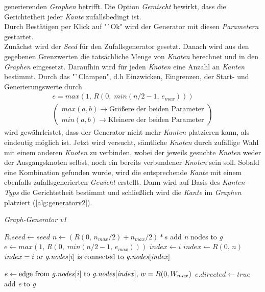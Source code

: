 \documentclass[12pt]{article}
\begin{document}
generierenden \textit{Graphen} betrifft. Die Option \textit{Gemischt} bewirkt, dass die Gerichtetheit jeder \textit{Kante} zufallsbedingt ist.
\\
Durch Bestätigen per Klick auf "`Ok" wird der Generator mit diesen \textit{Parametern} gestartet.
\\
Zunächst wird der \textit{Seed} für den Zufallsgenerator gesetzt. Danach wird aus den gegebenen Grenzwerten die tatsächliche Menge von \textit{Knoten} berechnet und in den \textit{Graphen} eingesetzt. Daraufhin wird für jeden 
\textit{Knoten} eine Anzahl an \textit{Kanten} bestimmt. Durch das "`Clampen", d.h Einzwicken, Eingrenzen, der Start- und 
Generierungswerte durch
\vspace{-20pt}
\begin{gather*}
e = max(1,\,R(0,\;min(n/2-1,\,e_{max}))) \\
\left(\begin{aligned}
max(a, b) \to \text{Größere der beiden Parameter}\\
min(a, b) \to \text{Kleinere der beiden Parameter}
\end{aligned}
\right)
\end{gather*}
wird gewährleistet, dass der Generator nicht mehr \textit{Kanten} platzieren kann, als eindeutig möglich ist. Jetzt wird versucht, sämtliche \textit{Knoten} durch zufällige Wahl mit einem anderen 
\textit{Knoten} zu verbinden, wobei der jeweils gesuchte \textit{Knoten} weder der Ausgangsknoten selbst, noch ein bereits verbundener \textit{Knoten} sein soll. Sobald eine Kombination gefunden wurde, 
wird die entsprechende \textit{Kante} mit einem ebenfalls zufallsgenerierten \textit{Gewicht} erstellt. Dann wird auf Basis des \textit{Kanten-Typs} die Gerichtetheit bestimmt und schließlich wird die 
\textit{Kante} im \textit{Graphen} platziert (\autoref{alg:generatorv2}).

\begin{algorithm}
\caption{\textit{Graph-Generator v1} \label{alg:generator}}
\begin{algorithmic}[1]
\Statex
{}
\Statex
{}
	\State $R.seed \gets seed$
	\State $n \gets (R(0,\,n_{max}/2) + n_{max}/2) * s$
	\State add \textit{n} nodes to \textit{g}
		\State $e \gets max(1,\,R(0,\;min(n/2-1,\,e_{max})))$
			\State $index \gets i$
			\Repeat 
				\State $index \gets R(0,\,n)$
			\Until $index = i \text{ or \textit{g.nodes}[\textit{i}] is connected to \textit{g.nodes}[\textit{index}]}$
			
			\State $e \gets \text{edge from \textit{g.nodes}[\textit{i}] to \textit{g.nodes}[\textit{index}], } w = R(0, W_{max})$
				\State $e.directed \gets true$
			\EndIf
			\State add \textit{e} to \textit{g}
		\EndFor
	\EndFor
\EndProcedure

\end{algorithmic}
\end{algorithm}
\end{document}
